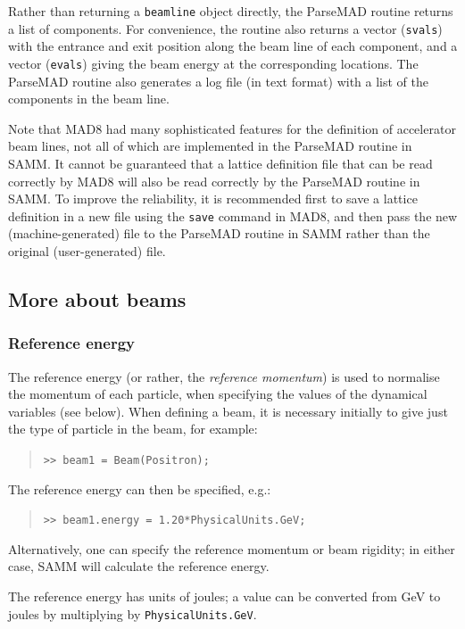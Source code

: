\documentclass[11pt,twoside,a4paper]{article}
\begin{document}
Rather than returning a \texttt{beamline} object directly, the ParseMAD routine
returns a list of components.  For convenience, the routine also returns a vector
(\texttt{svals}) with the entrance and exit position along the beam line of each
component, and a vector (\texttt{evals}) giving the beam energy at the corresponding
locations.  The ParseMAD routine also generates a log file (in text format) with a list of the
components in the beam line.

Note that MAD8 had many sophisticated features for the definition of accelerator
beam lines, not all of which are implemented in the ParseMAD routine in SAMM.
It cannot be guaranteed that a lattice definition file that can be read correctly by
MAD8 will also be read correctly by the ParseMAD routine in SAMM.  To improve
the reliability, it is recommended first to save a lattice definition in a new file using
the \texttt{save} command in MAD8, and then pass the new (machine-generated)
file to the ParseMAD routine in SAMM rather than the original (user-generated) file.


\subsection{More about beams\label{sec:modellingabeam}}

\subsubsection{Reference energy}
The reference energy (or rather, the \emph{reference momentum}) is used
to normalise the momentum of each particle, when specifying the values of
the dynamical variables (see below).  When defining a beam, it is necessary
initially to give just the type of particle in the beam, for example:
\begin{quote}
\texttt{>> beam1 = Beam(Positron);}
\end{quote}
The reference energy can then be specified, e.g.:
\begin{quote}
\texttt{>> beam1.energy = 1.20*PhysicalUnits.GeV;}
\end{quote}
Alternatively, one can specify the reference momentum or beam rigidity;
in either case, SAMM will calculate the reference energy.

The reference energy has units of joules; a value can be converted from
GeV to joules by multiplying by \texttt{PhysicalUnits.GeV}.
\end{document}
